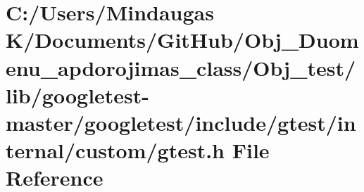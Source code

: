 \hypertarget{_obj__test_2lib_2googletest-master_2googletest_2include_2gtest_2internal_2custom_2gtest_8h}{}\section{C\+:/\+Users/\+Mindaugas K/\+Documents/\+Git\+Hub/\+Obj\+\_\+\+Duomenu\+\_\+apdorojimas\+\_\+class/\+Obj\+\_\+test/lib/googletest-\/master/googletest/include/gtest/internal/custom/gtest.h File Reference}
\label{_obj__test_2lib_2googletest-master_2googletest_2include_2gtest_2internal_2custom_2gtest_8h}
